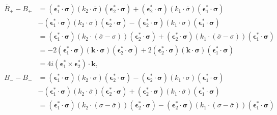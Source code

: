 \begin{align}
  \begin{split}
    \overline{B}_+ - B_+ &= (\boldsymbol{\epsilon}_1^\ast \cdot \boldsymbol\sigma)(k_2 \cdot \overline\sigma)(\boldsymbol{\epsilon}_2^\ast \cdot \boldsymbol\sigma)
    + (\boldsymbol{\epsilon}_2^\ast \cdot \boldsymbol\sigma)(k_1 \cdot \overline\sigma)(\boldsymbol{\epsilon}_1^\ast \cdot \boldsymbol\sigma) \\
    &- (\boldsymbol{\epsilon}_1^\ast \cdot \boldsymbol\sigma)(k_2 \cdot \sigma)(\boldsymbol{\epsilon}_2^\ast \cdot \boldsymbol\sigma)
    - (\boldsymbol{\epsilon}_2^\ast \cdot \boldsymbol\sigma)(k_1 \cdot \sigma)(\boldsymbol{\epsilon}_1^\ast \cdot \boldsymbol\sigma) \\
    &= (\boldsymbol{\epsilon}_1^\ast \cdot \boldsymbol\sigma)(k_2 \cdot (\overline\sigma - \sigma))(\boldsymbol{\epsilon}_2^\ast \cdot \boldsymbol\sigma)
    + (\boldsymbol{\epsilon}_2^\ast \cdot \boldsymbol\sigma)(k_1 \cdot (\overline\sigma - \sigma))(\boldsymbol{\epsilon}_1^\ast \cdot \boldsymbol\sigma) \\
    &= -2(\boldsymbol{\epsilon}_1^\ast \cdot \boldsymbol\sigma)(\boldsymbol{k}\cdot\boldsymbol\sigma)(\boldsymbol{\epsilon}_2^\ast \cdot \boldsymbol\sigma)
    + 2(\boldsymbol{\epsilon}_2^\ast \cdot \boldsymbol\sigma)(\boldsymbol{k}\cdot\boldsymbol\sigma)(\boldsymbol{\epsilon}_1^\ast \cdot \boldsymbol\sigma) \\
    &= 4i (\boldsymbol{\epsilon}_1^\ast \times \boldsymbol{\epsilon}_2^\ast) \cdot \boldsymbol{k} , \\
    B_- - \overline{B}_- &= (\boldsymbol{\epsilon}_1^\ast \cdot \boldsymbol\sigma)(k_2 \cdot \sigma)(\boldsymbol{\epsilon}_2^\ast \cdot \boldsymbol\sigma)
    - (\boldsymbol{\epsilon}_2^\ast \cdot \boldsymbol\sigma)(k_1 \cdot \sigma)(\boldsymbol{\epsilon}_1^\ast \cdot \boldsymbol\sigma) \\
    &- (\boldsymbol{\epsilon}_1^\ast \cdot \boldsymbol\sigma)(k_2 \cdot \overline\sigma)(\boldsymbol{\epsilon}_2^\ast \cdot \boldsymbol\sigma)
    + (\boldsymbol{\epsilon}_2^\ast \cdot \boldsymbol\sigma)(k_1 \cdot \overline\sigma)(\boldsymbol{\epsilon}_1^\ast \cdot \boldsymbol\sigma) \\
    &= (\boldsymbol{\epsilon}_1^\ast \cdot \boldsymbol\sigma)(k_2 \cdot (\sigma - \overline\sigma ))(\boldsymbol{\epsilon}_2^\ast \cdot \boldsymbol\sigma)
    - (\boldsymbol{\epsilon}_2^\ast \cdot \boldsymbol\sigma)(k_1 \cdot (\sigma - \overline\sigma))(\boldsymbol{\epsilon}_1^\ast \cdot \boldsymbol\sigma) \\

\end{split}
\end{align}
